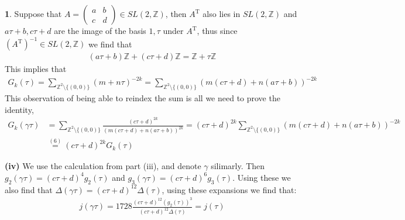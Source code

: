 \documentclass[10.5pt]{article}
\theoremstyle{definition}
\newtheorem{pb}{}
\newcommand{\set}[1]{\{#1\}}
\begin{document}
\begin{pb}
        Suppose that \(A = \begin{pmatrix} a & b \\ c & d \end{pmatrix} \in SL(2,\mathbb{Z})\), then \(A^{\text{T}}\) also lies in \(SL(2,\mathbb{Z})\) and \(a \tau + b, c \tau + d\) are the image of the basis \(1,\tau\) under \(A^{\text{T}}\), thus since \((A^\text{T})^{-1} \in SL(2,\mathbb{Z})\) we find that \begin{align}(a\tau + b)\mathbb{Z} + (c\tau + d)\mathbb{Z} = \mathbb{Z} +  \tau \mathbb{Z}\end{align} This implies that
        \begin{align}
            G_k(\tau) = \sum_{\mathbb{Z}^2 \setminus \set{(0,0)}} (m+n\tau)^{-2k} = \sum_{\mathbb{Z}^2 \setminus \set{(0,0)}} (m(c\tau + d)+n(a\tau + b))^{-2k}
        \end{align}
        This observation of being able to reindex the sum is all we need to prove the identity,
        \begin{align}
            G_k(\gamma\tau) &= \sum_{\mathbb{Z}^2\setminus\set{(0,0)}}\frac{(c\tau + d)^{2k}}{(m(c\tau + d) + n(a\tau + b))^{2k}} = (c\tau + d)^{2k} \sum_{\mathbb{Z}^2 \setminus \set{(0,0)}} (m(c\tau + d)+n(a\tau + b))^{-2k} \\
            &\overset{(6)}{=} (c\tau + d)^{2k} G_k(\tau)
        \end{align}

        \textbf{(iv)} We use the calculation from part (iii), and denote \(\gamma\) silimarly. Then \(g_2(\gamma\tau) = (c\tau + d)^4g_2(\tau)\) and \(g_3(\gamma\tau) = (c\tau + d)^6g_3(\tau)\). Using these we also find that \(\Delta(\gamma\tau) = (c\tau + d)^{12}\Delta(\tau)\), using these expansions we find that:
        \begin{align}
            j(\gamma\tau) = 1728\frac{(c\tau + d)^{12}(g_2(\tau))^3}{(c\tau + d)^{12}\Delta(\tau)} = j(\tau)
        \end{align}
    \end{pb}
\end{document}
